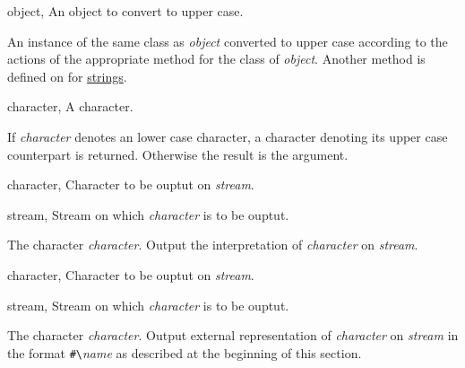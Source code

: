 \begin{optDefinition}
%
\begin{genericargs}
    \item[object, \classref{object}] An object to convert to upper case.
\end{genericargs}
%
\result%
An instance of the same class as {\em object\/} converted to upper case
according to the actions of the appropriate method for the class of {\em
    object}.
%
\seealso%
Another method is defined on  for
\hyperref[string]{strings}.

%
\begin{specargs}
    \item[character, \classref{character}] A character.
\end{specargs}
%
\result%
If {\em character\/} denotes an lower case character, a character denoting its
upper case counterpart is returned.  Otherwise the result is the argument.

%
\begin{specargs}
    \item[character, \classref{character}] Character to be ouptut on {\em
        stream}.
    \item[stream, \classref{stream}] Stream on which {\em character\/} is to be
    ouptut.
\end{specargs}
%
\result%
The character {\em character}.
%
\remarks%
Output the interpretation of {\em character\/} on {\em stream}.

%
\begin{specargs}
    \item[character, \classref{character}] Character to be ouptut on {\em
        stream}.
    \item[stream, \classref{stream}] Stream on which {\em character\/} is to be
    ouptut.
\end{specargs}
%
\result%
The character {\em character}.
%
\remarks%
Output external representation of {\em character\/} on {\em stream\/} in the
format \verb+#\+{\em{}name\/} as described at the beginning of this section.
%
\end{optDefinition}
